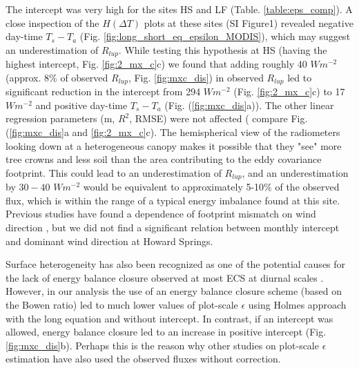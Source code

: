 \documentclass[fleqn,10pt]{wlscirep}
\providecommand{\DIFdelbegin}{} %
\begin{document}
 The intercept was very high for the sites HS and LF (Table. \ref{table:eps_comp}). A close inspection of the $H(\Delta T)$ plots at these sites (SI Figure1) revealed negative day-time $T_{s} -T_{a}$ (Fig. \ref{fig:long_short_eq_epsilon_MODIS}), which may suggest an underestimation of $R_{lup}$. While testing this hypothesis at HS (having the highest intercept, Fig. \ref{fig:2_mx_c}c) we found that  adding roughly 40 $Wm^{-2}$ (approx. 8\% of observed $R_{lup}$, Fig. \ref{fig:mxc_dis}) in observed $R_{lup}$ led to significant reduction in the intercept from 294 $Wm^{-2}$ (Fig. \ref{fig:2_mx_c}c) to 17 $Wm^{-2}$ and positive day-time $T_{s} - T_{a}$ (Fig. (\ref{fig:mxc_dis}a)). The other linear regression parameters (m, $R^{2}$, RMSE) were not affected ( compare Fig. (\ref{fig:mxc_dis}a and \ref{fig:2_mx_c}c). The hemispherical view of the radiometers looking down at a heterogeneous canopy makes it possible that they "see" more tree crowns and less soil than the area contributing to the eddy covariance footprint. This could lead to an underestimation of $R_{lup}$, and an underestimation by $30-40$ $Wm^{-2}$ would be equivalent to approximately 5-10$\%$ of the observed flux, which is within the range of a typical energy imbalance found at this site. Previous studies have found a dependence of footprint mismatch on wind direction \cite{chu2021representativeness,marcolla2018geometry,morillas2013using}, but we did not find a significant relation between monthly intercept and dominant wind direction at Howard Springs.

Surface heterogeneity has also been recognized as one of the potential causes for the lack of energy balance closure observed at most ECS at diurnal scales \cite{wilson2002energy, stoy2013data}. However, in our analysis the use of an energy balance closure scheme (based on the Bowen ratio) led to much lower values of plot-scale $\epsilon$ using Holmes approach with the long equation and without intercept. In contrast, if an intercept was allowed, energy balance closure led to an increase in positive intercept (Fig. \ref{fig:mxc_dis}b). Perhaps this is the reason why other studies on plot-scale $\epsilon$ estimation have also used the observed fluxes without correction\cite{holmes2009land,holmes2016cloud,maes2019potential}. \DIFdelbegin %
\end{document}
